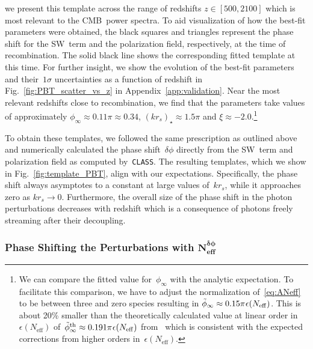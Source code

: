\documentclass[11pt]{article}
\numberwithin{equation}{section}
\newcommand{\Neff}{N_\mathrm{eff}}
\newcommand{\Nphase}{N_\mathrm{eff}^{\delta\phi}}
\begin{document}
we present this template across the range of redshifts $z \in [500, 2100]$ which is most relevant to the CMB~power spectra. To aid visualization of how the best-fit parameters were obtained, the black squares and triangles represent the phase shift for the SW~term and the polarization field, respectively, at the time of recombination. The solid black line shows the corresponding fitted template at this time. For further insight, we show the evolution of the best-fit parameters and their~$1\sigma$ uncertainties as a function of redshift in Fig.~\ref{fig:PBT_scatter_vs_z} in Appendix~\ref{app:validation}. Near the most relevant redshifts close to recombination, we find that the parameters take values of approximately $\phi_\infty \approx 0.11\pi \approx 0.34$, $(k r_s)_\star \approx 1.5\pi$ and $\xi \approx -2.0$.\footnote{We can compare the fitted value for~$\phi_\infty$ with the analytic expectation. To facilitate this comparison, we have to adjust the normalization of~\eqref{eq:ANeff} to be between three and zero species resulting in $\tilde{\phi}_\infty \approx 0.15\pi\hskip0.5pt\epsilon(\Neff)$. This is about 20\% smaller than the theoretically calculated value at linear order in~$\epsilon(\Neff)$ of~$\tilde{\phi}_\infty^\mathrm{th} \approx 0.191\pi\hskip0.5pt\epsilon(\Neff)$ from~\cite{Bashinsky:2003tk, Baumann:2015rya} which is consistent with the expected corrections from higher orders in~$\epsilon(\Neff)$.}

To obtain these templates, we followed the same prescription as outlined above and numerically calculated the phase shift~$\delta\phi$ directly from the SW~term and polarization field as computed by~\texttt{CLASS}. The resulting templates, which we show in Fig.~\ref{fig:template_PBT}, align with our expectations. Specifically, the phase shift always asymptotes to a constant at large values of~$k r_s$, while it approaches zero as $k r_s \to 0$. Furthermore, the overall size of the phase shift in the photon perturbations decreases with redshift which is a consequence of photons freely streaming after their decoupling.


\subsubsection[Phase Shifting the Perturbations with \texorpdfstring{$\Nphase$}{Neff-delta-phi}]{Phase Shifting the Perturbations with $\mathbf{N}_\mathbf{eff}^{\boldsymbol{\delta\phi}}$}
\label{sec:sources_to_Cells}
\end{document}
